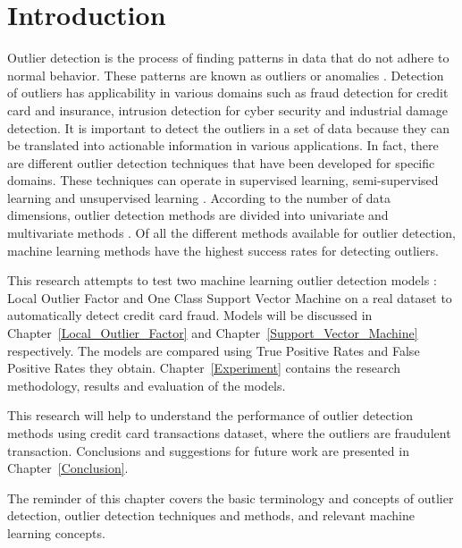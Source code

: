 \chapter{Introduction}
Outlier detection is the process of finding patterns in data that do not adhere to normal behavior. These patterns are known as outliers or anomalies \citep{Survey}. Detection of outliers has applicability in various domains such as fraud detection for credit card and insurance, intrusion detection for cyber security and industrial damage detection.
It is important to detect the outliers in a set of data because they can be translated into actionable information in various applications. In fact, there are different outlier detection techniques that have been developed for specific domains. These techniques can operate in supervised learning, semi-supervised learning and unsupervised learning \citep{Kurukshetra}. 
According to the number of data dimensions, outlier detection methods are divided into univariate and multivariate methods \citep{Clark,Knorr}. Of all the different methods available for outlier detection, machine learning methods have the highest success rates for detecting outliers. 

This research attempts to test two machine learning outlier detection models \citep{Silvia}: Local Outlier Factor and One Class Support Vector Machine on a real dataset to automatically detect credit card fraud. Models will be discussed in Chapter~\ref{Local_Outlier_Factor} and Chapter~\ref{Support_Vector_Machine} respectively. The models are compared using True Positive Rates and False Positive Rates they obtain. Chapter~\ref{Experiment} contains the research methodology, results and evaluation of the models.

This research will help to understand the performance of outlier detection methods using credit card transactions dataset, where the outliers are fraudulent transaction. Conclusions and suggestions for future work are presented in Chapter~\ref{Conclusion}.

The reminder of this chapter covers the basic terminology and concepts of outlier detection, outlier detection techniques and methods, and relevant machine learning concepts.
